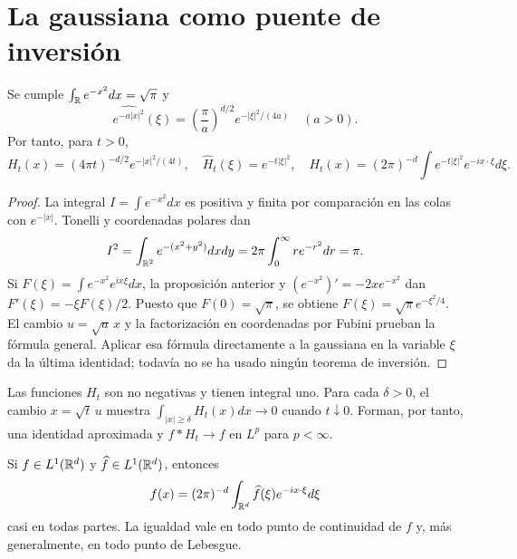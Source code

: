 \section{La gaussiana como puente de inversión}
\begin{lema}\label{v4:gaussiana}
Se cumple $\int_\mathbb R e^{-x^2}dx=\sqrt\pi$ y
\[
 \widehat{e^{-a|x|^2}}(\xi)=\left(\frac\pi a\right)^{d/2}e^{-|\xi|^2/(4a)}\quad(a>0).
\]
Por tanto, para $t>0$,
\[
 H_t(x)=(4\pi t)^{-d/2}e^{-|x|^2/(4t)},\quad
 \widehat H_t(\xi)=e^{-t|\xi|^2},\quad
 H_t(x)=(2\pi)^{-d}\int e^{-t|\xi|^2}e^{-ix\cdot\xi}d\xi.
\]
\end{lema}
\begin{proof}
La integral $I=\int e^{-x^2}dx$ es positiva y finita por comparación en las colas con $e^{-|x|}$. Tonelli y coordenadas polares dan
\[
 I^2=\int_{\mathbb R^2}e^{-(x^2+y^2)}dxdy
 =2\pi\int_0^\infty re^{-r^2}dr=\pi.
\]
Si $F(\xi)=\int e^{-x^2}e^{ix\xi}dx$, la proposición anterior y $(e^{-x^2})'=-2xe^{-x^2}$ dan $F'(\xi)=-\xi F(\xi)/2$. Puesto que $F(0)=\sqrt\pi$, se obtiene $F(\xi)=\sqrt\pi e^{-\xi^2/4}$. El cambio $u=\sqrt a\,x$ y la factorización en coordenadas por Fubini prueban la fórmula general. Aplicar esa fórmula directamente a la gaussiana en la variable $\xi$ da la última identidad; todavía no se ha usado ningún teorema de inversión.
\end{proof}
Las funciones $H_t$ son no negativas y tienen integral uno. Para cada $\delta>0$, el cambio $x=\sqrt t\,u$ muestra $\int_{|x|\geq\delta}H_t(x)dx\to0$ cuando $t\downarrow0$. Forman, por tanto, una identidad aproximada y $f*H_t\to f$ en $L^p$ para $p<\infty$.
\begin{teorema}[Inversión]\label{v4:inversion-Rn}
Si $f\in L^1(\mathbb R^d)$ y $\widehat f\in L^1(\mathbb R^d)$, entonces
\[
 f(x)=(2\pi)^{-d}\int_{\mathbb R^d}\widehat f(\xi)e^{-ix\cdot\xi}d\xi
\]
casi en todas partes. La igualdad vale en todo punto de continuidad de $f$ y, más generalmente, en todo punto de Lebesgue.
\end{teorema}
